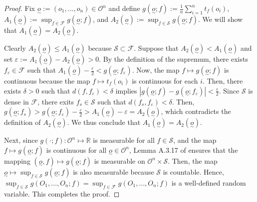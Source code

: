 \documentclass[twoside,11pt]{article}
\newcommand{\mc}{\mathcal}
\begin{document}
\begin{proof} Fix $\underset{\sim}{o}:=(o_1,\dots, o_n)\in\mc{O}^n$ and define $g(\underset{\sim}{o};f):=\frac{1}{n}\sum_{i=1}^nt_f(o_i)$, $A_1(\underset{\sim}{o}):=\sup_{f\in \mc{F}} g(\underset{\sim}{o};f)$, and $A_2(\underset{\sim}{o}):=\sup_{f\in \mc{S}}g(\underset{\sim}{o};f)$. We will show that $A_1(\underset{\sim}{o})=A_2(\underset{\sim}{o})$.  

Clearly $A_2(\underset{\sim}{o})\le A_1(\underset{\sim}{o})$ because $\mc{S}\subset \mc{F}$. Suppose that $A_2(\underset{\sim}{o})<A_1(\underset{\sim}{o})$ and set $\varepsilon:=A_1(\underset{\sim}{o})-A_2(\underset{\sim}{o})>0$. By the definition of the supremum, there exists $f_\varepsilon\in\mc{F}$ such that $A_1(\underset{\sim}{o})-\frac{\varepsilon}{2}< g(\underset{\sim}{o};f_{\varepsilon})$.
Now, the map $f\mapsto g(\underset{\sim}{o};f)$ is continuous because the map $f\mapsto t_f(o_i)$ is continuous for each $i$. Then, there exists $\delta>0$ such that $d(f,f_\varepsilon)<\delta$ implies $|g(\underset{\sim}{o};f)-g(\underset{\sim}{o};f_{\varepsilon})|<\frac{\varepsilon}{2}$. Since $\mc{S}$ is dense in $\mc{F}$, there exits $f_s\in \mc{S}$ such that $d(f_s,f_\varepsilon)<\delta$. Then, $g(\underset{\sim}{o};f_s)>g(\underset{\sim}{o};f_{\varepsilon})-\frac{\varepsilon}{2}>A_1(\underset{\sim}{o})-\varepsilon=A_2(\underset{\sim}{o})$, which contradicts the definition of $A_2(\underset{\sim}{o})$. We thus conclude that $A_1(\underset{\sim}{o})=A_2(\underset{\sim}{o})$.

Next, since $g(\cdot;f):\mc{O}^n\mapsto\mathbb{R}$ is measurable for all $f\in \mc{S}$, and the map $f\mapsto g(\underset{\sim}{o};f)$ is continuous for all $\underset{\sim}{o}\in\mc{O}^n$, Lemma A.3.17 of \cite{steinwart2008support} ensures that the mapping $(\underset{\sim}{o},f)\mapsto g(\underset{\sim}{o};f)$ is measurable on $\mc{O}^n\times\mc{S}$. Then, the map $\underset{\sim}{o}\mapsto\sup_{f\in\mc{S}}g(\underset{\sim}{o};f)$ is also measurable because $\mc{S}$ is countable. Hence, $\sup_{f\in\mc{S}}g(O_1,\dots,O_n;f)= \sup_{f\in\mc{F}}g(O_1,\dots,O_n;f)$
is a well-defined random variable. This completes the proof.
\end{proof}
\end{document}
